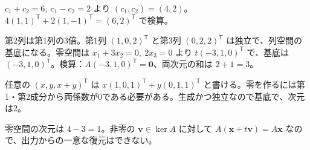 \documentclass[11pt]{article}
\begin{document}

\problem[基底座標]
\begin{ans}
$c_1+c_2=6,\ c_1-c_2=2$ より $(c_1,c_2)=(4,2)$。$4(1,1)^{\mathsf T}+2(1,-1)^{\mathsf T}=(6,2)^{\mathsf T}$ で検算。
\end{ans}

\problem[列空間と零空間]
\begin{ans}
第2列は第1列の3倍。第1列 $(1,0,2)^{\mathsf T}$ と第3列 $(0,2,2)^{\mathsf T}$ は独立で、列空間の基底になる。零空間は $x_1+3x_2=0,\ 2x_3=0$ より $t(-3,1,0)^{\mathsf T}$ で、基底は $(-3,1,0)^{\mathsf T}$。検算：$A(-3,1,0)^{\mathsf T}=\boldsymbol0$、両次元の和は $2+1=3$。
\end{ans}
\newpage

\problem[基底の判定]
\begin{ans}
任意の $(x,y,x+y)^{\mathsf T}$ は $x(1,0,1)^{\mathsf T}+y(0,1,1)^{\mathsf T}$ と書ける。零を作るには第1・第2成分から両係数が0である必要がある。生成かつ独立なので基底で、次元は2。
\end{ans}

\problem[測定の自由度]
\begin{ans}
零空間の次元は $4-3=1$。非零の $\boldsymbol v\in\ker A$ に対して $A(\boldsymbol x+t\boldsymbol v)=A\boldsymbol x$ なので、出力からの一意な復元はできない。
\end{ans}
\end{document}
